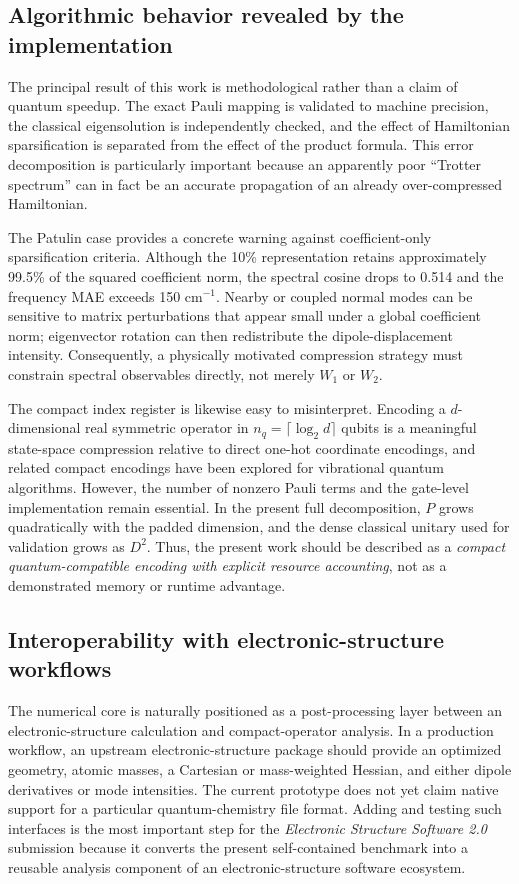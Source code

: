\documentclass[aip,jcp,reprint,amsmath,amssymb,floatfix]{revtex4-2}
\begin{document}
\subsection{Algorithmic behavior revealed by the implementation}
The principal result of this work is methodological rather than a claim of quantum speedup. The exact Pauli mapping is validated to machine precision, the classical eigensolution is independently checked, and the effect of Hamiltonian sparsification is separated from the effect of the product formula. This error decomposition is particularly important because an apparently poor ``Trotter spectrum'' can in fact be an accurate propagation of an already over-compressed Hamiltonian.

The Patulin case provides a concrete warning against coefficient-only sparsification criteria. Although the 10\% representation retains approximately 99.5\% of the squared coefficient norm, the spectral cosine drops to 0.514 and the frequency MAE exceeds 150 cm$^{-1}$. Nearby or coupled normal modes can be sensitive to matrix perturbations that appear small under a global coefficient norm; eigenvector rotation can then redistribute the dipole-displacement intensity. Consequently, a physically motivated compression strategy must constrain spectral observables directly, not merely $W_1$ or $W_2$.

The compact index register is likewise easy to misinterpret. Encoding a $d$-dimensional real symmetric operator in $n_q=\lceil\log_2d\rceil$ qubits is a meaningful state-space compression relative to direct one-hot coordinate encodings, and related compact encodings have been explored for vibrational quantum algorithms.\cite{Sawaya2020Resource,Sawaya2021Vibrational} However, the number of nonzero Pauli terms and the gate-level implementation remain essential. In the present full decomposition, $P$ grows quadratically with the padded dimension, and the dense classical unitary used for validation grows as $D^2$. Thus, the present work should be described as a \emph{compact quantum-compatible encoding with explicit resource accounting}, not as a demonstrated memory or runtime advantage.

\subsection{Interoperability with electronic-structure workflows}
The numerical core is naturally positioned as a post-processing layer between an electronic-structure calculation and compact-operator analysis. In a production workflow, an upstream electronic-structure package should provide an optimized geometry, atomic masses, a Cartesian or mass-weighted Hessian, and either dipole derivatives or mode intensities. The current prototype does not yet claim native support for a particular quantum-chemistry file format. Adding and testing such interfaces is the most important step for the \emph{Electronic Structure Software 2.0} submission because it converts the present self-contained benchmark into a reusable analysis component of an electronic-structure software ecosystem.
\end{document}
